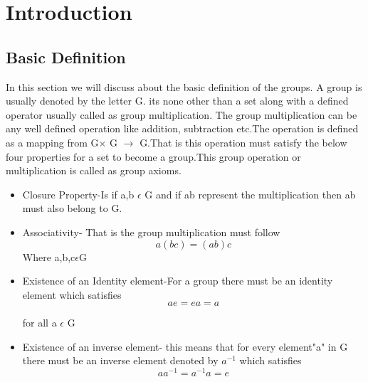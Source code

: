 \section{Introduction}
\subsection{Basic Definition}
In this section we will discuss about the basic definition of the groups. A group is usually denoted by the letter G. its none other than a set along with a defined operator usually called as group multiplication. The group multiplication can be any well defined operation like addition, subtraction etc.The operation is defined as a mapping from G$\times$ G $\longrightarrow$ G.That is this operation must satisfy the below four properties for a set to become a group.This group operation or multiplication is called as group axioms.
\begin{itemize}
    \item Closure Property-Is if a,b $\epsilon$ G and if ab represent the multiplication then ab must also belong to G. 
    \item Associativity- That is the group multiplication must follow
    \begin{equation}
        a(bc)=(ab)c
    \end{equation}
    Where a,b,c$\epsilon$G
    \item Existence of an Identity element-For a group there must be an identity element which satisfies 
    \begin{equation}
       ae=ea=a   
    \end{equation}
    
   for all a $\epsilon$ G
   
   \item Existence of an inverse element- this means that for every element"a" in G there must be an inverse element denoted by $a^{-1}$ which satisfies 
   \begin{equation}
       aa^{-1}=a^{-1}a=e
    \end{equation}
\end{itemize}

